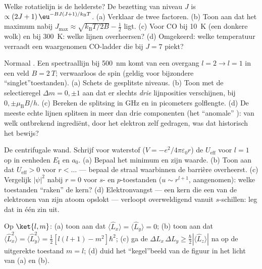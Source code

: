 \begin{exercise}[$\star\star$]\label{exo:b3:quantum-angular-momentum:6}
Welke rotatielijn is de helderste? De bezetting van niveau $J$ is
$\propto (2J+1)\,\eu^{-BJ(J+1)/k_{\text{B}}T}$. (a) Verklaar de twee
factoren. (b) Toon aan dat het maximum nabij $J_{\max} \approx
\sqrt{k_{\text{B}}T/2B} - \tfrac12$ ligt. (c) Voor CO bij \qty{10}{K}
(een donkere wolk) en bij \qty{300}{K}: welke lijnen overheersen? (d)
Omgekeerd: welke temperatuur verraadt een waargenomen CO-ladder die bij
$J = 7$ piekt?
\end{exercise}

\begin{exercise}[$\star\star$]\label{exo:b3:quantum-angular-momentum:7}
Normaal . Een spectraallijn bij \qty{500}{nm} komt van een
overgang $l = 2 \to l = 1$ in een veld $B = \qty{2}{T}$; verwaarloos de
spin (geldig voor bijzondere ``singlet''toestanden). (a) Schets de
gesplitste niveaus. (b) Toon met de selectieregel $\Delta m = 0, \pm1$ aan
dat er slechts \emph{drie} lijnposities verschijnen, bij $0, \pm\mu_{\text{B}}B/h$. (c) Bereken de splitsing in GHz en in picometers
golflengte. (d) De meeste echte lijnen splitsen in meer dan drie
componenten (het ``anomale'' ): van welk ontbrekend
ingrediënt, door het elektron zelf gedragen, was dat historisch het bewijs?
\end{exercise}

\begin{exercise}[$\star\star$]\label{exo:b3:quantum-angular-momentum:8}
De centrifugale wand. Schrijf voor waterstof ($V = -e^2/4\pi\varepsilon_0r$) de $U_{\text{eff}}$ voor $l = 1$ op in eenheden
$E_{\text{I}}$ en $a_0$. (a) Bepaal het minimum en zijn waarde. (b) Toon
aan dat $U_{\text{eff}} >
0$ voor $r < \dots$ --- bepaal de straal
waarbinnen de barrière overheerst. (c) Vergelijk $|\psi|^2$ nabij $r = 0$
voor $s$- en $p$-toestanden ($u \sim r^{l+1}$, aangenomen): welke
toestanden ``raken'' de kern? (d) Elektronvangst --- een kern die een van
de elektronen van zijn atoom opslokt --- verloopt overweldigend vanuit
$s$-schillen: leg dat in één zin uit.
\end{exercise}

\begin{exercise}[$\star\star$]\label{exo:b3:quantum-angular-momentum:9}
Op $\ket{l, m}$: (a) toon aan dat $\langle\hat L_x\rangle = \langle\hat
L_y\rangle = 0$; (b) toon aan dat $\langle\hat L_x^2\rangle = \langle\hat
L_y^2\rangle = \tfrac12[l(l+1) - m^2]\hbar^2$; (c) ga de
 $\Delta L_x\,\Delta L_y \ge \tfrac\hbar2
|\langle\hat L_z\rangle|$ na op de uitgerekte toestand $m = l$; (d) duid
het ``kegel''beeld van de figuur in het licht van (a) en (b).
\end{exercise}

